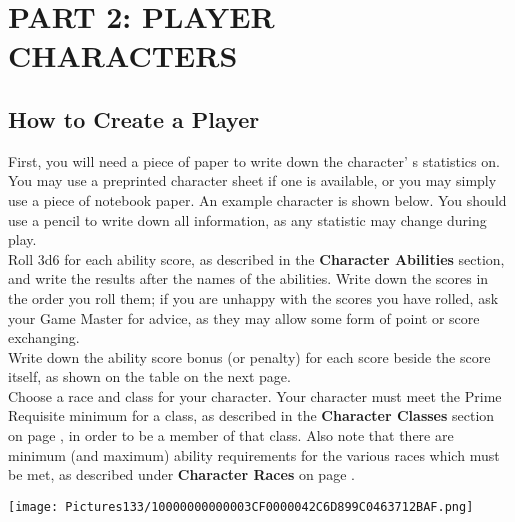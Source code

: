 \documentclass[a4paper,twoside,openany,10pt]{book}
\begin{document}
\pagebreak

\section{PART 2: PLAYER CHARACTERS}\label{part-2-player-characters}

\begin{multicols}{2}

\subsection{How to Create a Player}

\label{how-to-create-a-player-character}

First, you will need a piece of paper to write down the character' s statistics on. You may use a preprinted character sheet if one is available, or you may simply use a piece of notebook paper. An example character is shown below. You should use a pencil to write down all information, as any statistic may change during play.\\

Roll 3d6 for each ability score, as described in the \textbf{Character Abilities} section, and write the results after the names of the abilities. Write down the scores in the order you roll them; if you are unhappy with the scores you have rolled, ask your Game Master for advice, as they may allow some form of point or score exchanging.\\

Write down the ability score bonus (or penalty) for each score beside the score itself, as shown on the table on the next page.\\

Choose a race and class for your character. Your character must meet the Prime Requisite minimum for a class, as described in the \textbf{Character Classes} section on page \hyperlink{character-classes}{\pageref{character-classes}}, in order to be a member of that class. Also note that there are minimum (and maximum) ability requirements for the various races which must be met, as described under \textbf{Character Races} on page \hyperlink{character-races}{\pageref{character-races}}.\\

\begin{flushleft}
	\texttt{[image: Pictures133/10000000000003CF0000042C6D899C0463712BAF.png]}
\end{flushleft}\medskip


\end{multicols}
\end{document}
